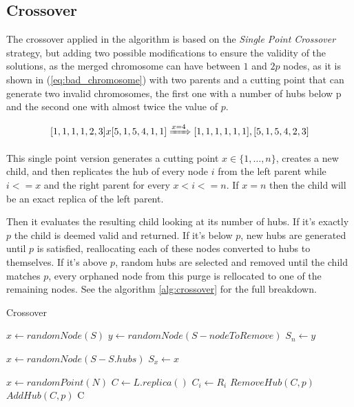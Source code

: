 \documentclass[onecolumn]{IEEEtran}
\begin{document}
\subsection{Crossover\label{ss:crossover}}

The crossover applied in the algorithm is based on the \emph{Single Point Crossover} strategy, but adding
two possible modifications to ensure the validity of the solutions, as the merged chromosome can
have between $1$ and $2p$ nodes, as it is shown in (\ref{eq:bad_chromosome}) with two parents and a
cutting point that can generate two invalid chromosomes, the first one with a number of hubs below
p and the second one with almost twice the value of $p$.

\begin{equation}
  \label{eq:bad_chromosome}
  [1,1,1,1,2,3] x [5,1,5,4,1,1] \xRightarrow{x=4} [1,1,1,1,1,1], [5,1,5,4,2,3]
\end{equation}

This single point version generates a cutting point $x \in \{1,\dots,n\}$, creates a new child, and
then replicates the hub of every node $i$ from the left parent while $i<=x$ and the right
parent for every $x<i<=n$. If $x=n$ then the child will be an exact replica of the left parent.

Then it evaluates the resulting child looking at its number of hubs. If it's exactly $p$ the child
is deemed valid and returned. If it's below $p$, new hubs are generated until $p$ is satisfied, reallocating
each of these nodes converted to hubs to themselves. If it's above $p$, random hubs are selected and
removed until the child matches $p$, every orphaned node from this purge is rellocated to one of the
remaining nodes. See the algorithm \ref{alg:crossover} for the full breakdown.

\begin{algorithm}[H]
  \caption{Crossover}
  \label{alg:crossover}
  \begin{algorithmic}[1]
        \State $x \gets randomNode(S)$
        \State $y \gets randomNode(S - nodeToRemove)$
            \State $S_{n} \gets y$
          \EndIf
        \EndFor
      \EndWhile
    \EndFunction
    \item[]
        \State $x \gets randomNode(S - S.hubs)$
        \State $S_{x} \gets x$
      \EndWhile
    \EndFunction
  \item[]
  \State $x \gets randomPoint(N)$
  \State $C \gets L.replica()$
    \State $C_{i} \gets R_{i}$
  \EndFor
    $RemoveHub(C,p)$
    $AddHub(C,p)$
  \EndIf
  \State \Return C
  \end{algorithmic}
\end{algorithm}
\end{document}
